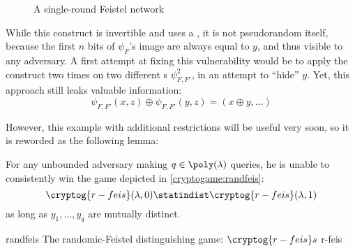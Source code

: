 \begin{figure}
    \centering

    
    \label{fig:feistel}
    \caption{A single-round Feistel network}
\end{figure}

While this construct is invertible and uses a \prf{}, it is not pseudorandom itself, because the first $n$ bits of $\psi_F$'s image are always equal to $y$, and thus visible to any adversary. A first attempt at fixing this vulnerability would be to apply the construct two times on two different \prf{}s $\psi^2_{F, F'}$, in an attempt to ``hide'' $y$. Yet, this approach still leaks valuable information:
\[
    \psi_{F, F'}(x, z) \oplus \psi_{F, F'}(y, z) = (x \oplus y, \dots)
\]

However, this example with additional restrictions will be useful very soon, so it is reworded as the following lemma:

\begin{lemma}
    For any unbounded adversary making $q \in \poly(\lambda)$ queries, he is unable to consistently win the game depicted in \ref{cryptogame:randfeis}:
    \[
        \cryptog{r-feis}(\lambda, 0) \statindist \cryptog{r-feis}(\lambda, 1)
    \]
    as long as $y_1, \ldots, y_q$ are mutually distinct.
\end{lemma}

\begin{cryptogame}
    {randfeis}
    {The randomic-Feistel distinguishing game: $\cryptog{r-feis}s$}
    {r-feis}


    \cseqdelay
    \cseqbeginloop
    \cseqendloop
    \cseqdelay


\end{cryptogame}

